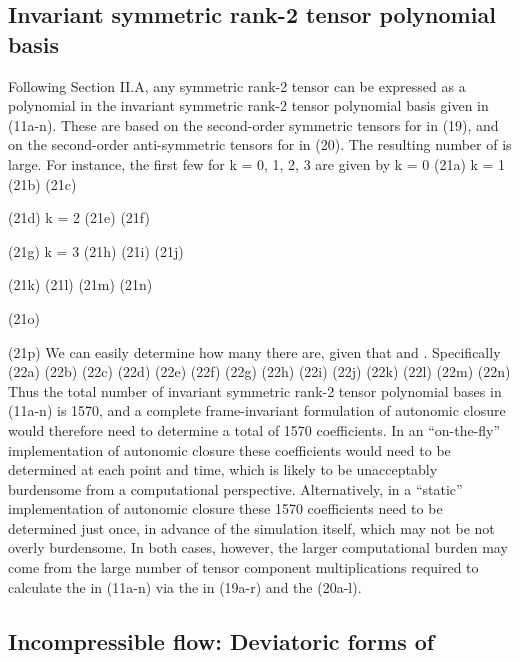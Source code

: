 \subsection{Invariant symmetric rank-2 tensor polynomial basis  }

Following Section II.A, any symmetric rank-2 tensor can be expressed as a polynomial in the invariant symmetric rank-2 tensor polynomial basis   given in (11a-n).  These are based on the second-order symmetric tensors   for   in (19), and on the second-order anti-symmetric tensors   for   in (20).  The resulting number of  is large.  For instance, the first few   for k = 0, 1, 2, 3 are given by 
	k = 0	 	(21a)
	k = 1	 	(21b) 
	 	(21c) 
	 
	 	(21d) 
	k = 2	 	(21e) 
	 	(21f) 
	 
	 	(21g) 
	k = 3	 	(21h) 
	 	(21i) 
	 	(21j) 
	 
	 	(21k) 
	 	(21l) 
	 	(21m) 
	 	(21n) 
	 
	 	(21o)
	 	
	 	(21p) 
We can easily determine how many   there are, given that  and  .  Specifically  
		 	(22a)
		 	(22b)
		 	(22c)
		 	(22d)
		 	(22e)
		 	(22f)
		 	(22g)
		 	(22h)
		 	(22i)
		 	(22j)
		 	(22k)
		 	(22l)
		 	(22m)
		 	(22n)
Thus the total number of invariant symmetric rank-2 tensor polynomial bases   in (11a-n) is 1570, and a complete frame-invariant formulation of autonomic closure would therefore need to determine a total of 1570 coefficients. 
In an “on-the-fly” implementation of autonomic closure these coefficients would need to be determined at each point and time, which is likely to be unacceptably burdensome from a computational perspective. Alternatively, in a “static” implementation of autonomic closure these 1570 coefficients need to be determined just once, in advance of the simulation itself, which may not be not overly burdensome.  In both cases, however, the larger computational burden may come from the large number of tensor component multiplications required to calculate the   in (11a-n) via the   in (19a-r) and the   (20a-l).


\subsection{Incompressible flow: Deviatoric forms of  }

